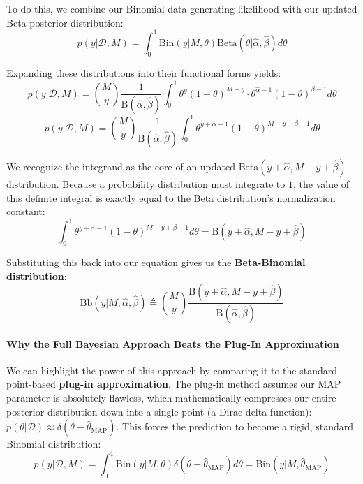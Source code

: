 \documentclass{article}
\begin{document}
To do this, we combine our Binomial data-generating likelihood with our updated Beta posterior distribution:
\begin{equation}
p(y|\mathcal{D}, M) = \int_0^1 \text{Bin}(y|M, \theta)\text{Beta}(\theta|\hat{\alpha}, \hat{\beta})d\theta
\end{equation}

Expanding these distributions into their functional forms yields:
\begin{equation}
p(y|\mathcal{D}, M) = \binom{M}{y}\frac{1}{\text{B}(\hat{\alpha}, \hat{\beta})}\int_0^1 \theta^y (1-\theta)^{M-y} \cdot \theta^{\hat{\alpha}-1}(1-\theta)^{\hat{\beta}-1}d\theta
\end{equation}
\begin{equation}
p(y|\mathcal{D}, M) = \binom{M}{y}\frac{1}{\text{B}(\hat{\alpha}, \hat{\beta})}\int_0^1 \theta^{y+\hat{\alpha}-1}(1-\theta)^{M-y+\hat{\beta}-1}d\theta
\end{equation}

We recognize the integrand as the core of an updated $\text{Beta}(y+\hat{\alpha}, M-y+\hat{\beta})$ distribution. Because a probability distribution must integrate to $1$, the value of this definite integral is exactly equal to the Beta distribution's normalization constant:
\begin{equation}
\int_0^1 \theta^{y+\hat{\alpha}-1}(1-\theta)^{M-y+\hat{\beta}-1}d\theta = \text{B}(y+\hat{\alpha}, M-y+\hat{\beta})
\end{equation}

Substituting this back into our equation gives us the \textbf{Beta-Binomial distribution}:
\begin{equation}
\text{Bb}(y|M, \hat{\alpha}, \hat{\beta}) \triangleq \binom{M}{y}\frac{\text{B}(y+\hat{\alpha}, M-y+\hat{\beta})}{\text{B}(\hat{\alpha}, \hat{\beta})}
\end{equation}

\paragraph{Why the Full Bayesian Approach Beats the Plug-In Approximation}
We can highlight the power of this approach by comparing it to the standard point-based \textbf{plug-in approximation}. The plug-in method assumes our MAP parameter is absolutely flawless, which mathematically compresses our entire posterior distribution down into a single point (a Dirac delta function): $p(\theta|\mathcal{D}) \approx \delta(\theta - \hat{\theta}_{\text{MAP}})$. This forces the prediction to become a rigid, standard Binomial distribution:
\begin{equation}
p(y|\mathcal{D}, M) = \int_0^1 \text{Bin}(y|M, \theta)\delta(\theta - \hat{\theta}_{\text{MAP}})d\theta = \text{Bin}(y|M, \hat{\theta}_{\text{MAP}})
\end{equation}
\end{document}
